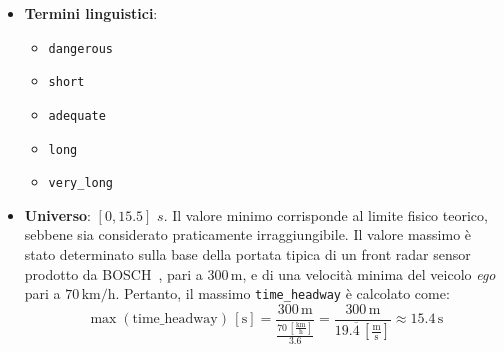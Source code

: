 \begin{itemize}
  \item \textbf{Termini linguistici}:
    \begin{itemize}
      \item \texttt{dangerous}
      \item \texttt{short}
      \item \texttt{adequate}
      \item \texttt{long}
      \item \texttt{very\_long}
    \end{itemize}
  \item \textbf{Universo}: \([0,15.5]\) $s$.  
        Il valore minimo corrisponde al limite fisico teorico, sebbene sia considerato praticamente irraggiungibile.
        Il valore massimo è stato determinato sulla base della portata tipica di un front radar sensor prodotto da BOSCH~\cite{bosch_radar}, pari a \(300\,\mathrm{m}\), e di una velocità minima del veicolo \emph{ego} pari a \(70\,\mathrm{km/h}\).  
        Pertanto, il massimo \texttt{time\_headway} è calcolato come:
        \[
            \max(\text{time\_headway})\,[\mathrm{s}] =
            \frac{300 \,\mathrm{m}}{\frac{70\,[\frac{\mathrm{km}}{\mathrm{h}}]}{3.6}} = 
            \frac{300 \,\mathrm{m}}{19.\overline{4}\,[\frac{\mathrm{m}}{\mathrm{s}}]}
            \approx 15.4\,\mathrm{s}
        \]
\end{itemize}

